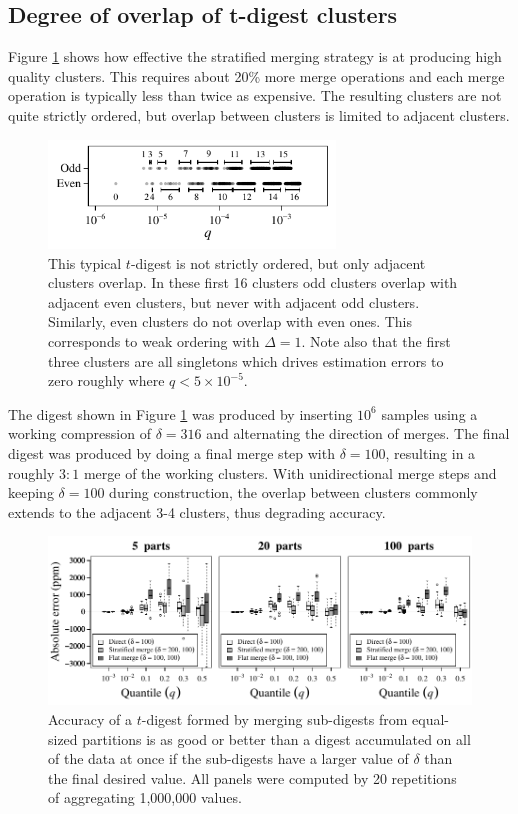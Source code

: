 \documentclass{vldb}
\begin{document}
\subsection{Degree of overlap of t-digest clusters}
Figure \ref{fig:cluster-spread} shows how effective the stratified merging strategy  is at producing high quality clusters. This requires about 20\% more merge operations and  each merge operation is typically less than twice as expensive. The resulting clusters are not quite strictly ordered, but overlap between clusters is limited to adjacent clusters.
\begin{figure}[htb] %
\center
   \includegraphics[width=3in]{figures/cluster-spread.pdf} 
   \caption{This typical $t$-digest is not strictly ordered, but only adjacent clusters overlap. In these first 16 clusters odd clusters overlap with adjacent even clusters, but never with adjacent odd clusters. Similarly, even clusters do not overlap with even ones. 
This corresponds to weak ordering with $\Delta=1$. Note also that the first three clusters are all singletons which drives estimation errors to zero roughly where $q < 5 \times 10^{-5}$.  }
   \label{fig:cluster-spread}
\end{figure}
The digest shown in Figure \ref{fig:cluster-spread} was produced by inserting $10^6$ samples using a working compression of $\delta = 316$ and alternating the direction of merges. The final digest was produced by doing a final merge step with $\delta = 100$, resulting in a roughly $3:1$ merge of the working clusters. With unidirectional merge steps and keeping $\delta=100$ during construction, the overlap between clusters commonly extends to the adjacent 3-4 clusters, thus degrading accuracy.
\begin{figure}[htb] %
   \centering
   \includegraphics[width=5in]{figures/merge.pdf} 
   \caption{Accuracy of a $t$-digest formed by merging sub-digests from equal-sized partitions is as good or better than a digest accumulated on all of the data at once if the sub-digests have a larger value of $\delta$ than the final desired value. All panels were computed by 20 repetitions of aggregating 1,000,000 values.}
   \label{fig:merge}
\end{figure}
\end{document}
